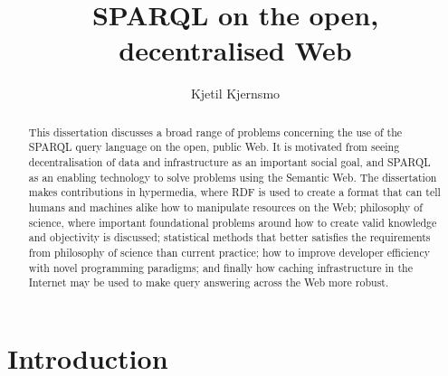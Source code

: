 \documentclass[a4paper, 12pt, draft, UKenglish]{uiophd}
\begin{document}
\title{SPARQL on the open, decentralised Web}
\author{Kjetil Kjernsmo}


\frontmatter
\maketitle


\begin{abstract}
  This dissertation discusses a broad range of problems concerning the
  use of the SPARQL query language on the open, public Web. It is
  motivated from seeing decentralisation of data and infrastructure as
  an important social goal, and SPARQL as an enabling technology to
  solve problems using the Semantic Web. The dissertation makes
  contributions in hypermedia, where RDF is used to create a format
  that can tell humans and machines alike how to manipulate resources
  on the Web; philosophy of science, where important foundational
  problems around how to create valid knowledge and objectivity is
  discussed; statistical methods that better satisfies the
  requirements from philosophy of science than current practice; how
  to improve developer efficiency with novel programming paradigms;
  and finally how caching infrastructure in the Internet may be used
  to make query answering across the Web more robust.
\end{abstract}

\tableofcontents

\chapter{Introduction}











\end{document}

